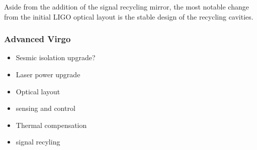 Aside from the addition of the signal recycling mirror, the most notable change from the initial LIGO optical 
layout is the stable design of the recycling cavities.


\subsubsection{Advanced Virgo}
\begin{itemize}
\item Sesmic isolation upgrade?
\item Laser power upgrade
\item Optical layout
\item sensing and control
\item Thermal compensation
\item signal recyling
\end{itemize}